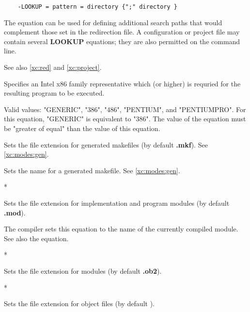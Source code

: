 \begin{description}
\verb'    -LOOKUP = pattern = directory {";" directory }'

        The equation can be used for defining additional search paths
        that would complement those set in the redirection file.
        A configuration or project file may contain several
        {\bf LOOKUP} equations; they are also permitted on the
        command line.

        See also \ref{xc:red} and \ref{xc:project}.

\ifgencode
{}
        \MLBegin{}\ModeC{}\MLEnd{}

        Specifies an Intel x86 family representative
        which (or higher) is requried for the resulting program
        to be executed.

        Valid values: "GENERIC", "386", "486", "PENTIUM", and
        "PENTIUMPRO". For this equation, "GENERIC" is equivalent
        to "386". The value of the  equation must be
        "greater of equal" than the value of this equation.
\fi

        \MLBegin{}\ModeG{}\MLEnd{}

        Sets the file extension for generated makefiles
        (by default {\bf .mkf}). See \ref{xc:modes:gen}.

        \MLBegin{}\ModeG{}\MLEnd{}

        Sets the name for a generated makefile. See \ref{xc:modes:gen}.

        \MLBegin{}*\MLEnd{}

        Sets the file extension for \mt{} implementation
        and program modules (by default {\bf .mod}).

        \MLBegin{}\ModeC\MLEnd{}

        The compiler sets this equation to the name of the currently
        compiled module. See also the  equation.

        \MLBegin{}*\MLEnd{}

        Sets the file extension for \ot{}
        modules (by default {\bf .ob2}).

        \MLBegin{}*\MLEnd{}

        Sets the file extension for object files
        (by default {\bf \dotObj}).


\end{description}
